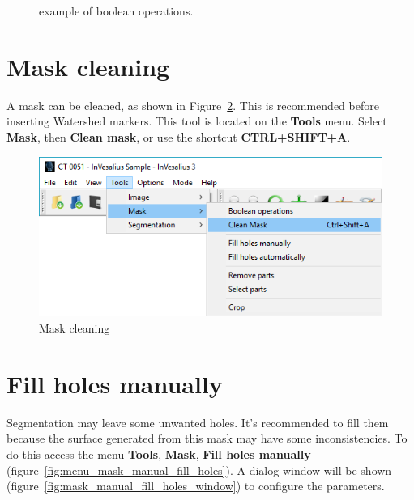 \begin{figure}[!htb]
  \hfill
  \caption{example of boolean operations.}
  \label{fig:op_boolana}
\end{figure}

\section{Mask cleaning}
\label{cap:limpeza_mascara}

A mask can be cleaned, as shown in Figure~\ref{fig:limpeza_mascara}. This is recommended before inserting Watershed markers. This tool is located on the \textbf{Tools} menu. Select \textbf{Mask}, then \textbf{Clean mask}, or use the shortcut \textbf{CTRL+SHIFT+A}.

\begin{figure}[!htb]
\centering
\includegraphics[scale=0.5]{../user_guide_figures/invesalius_screen/mask_clean_menu_en.png}
\caption{Mask cleaning}
\label{fig:limpeza_mascara}
\end{figure}

\section{Fill holes manually}

Segmentation may leave some unwanted holes. It's recommended to fill them because the surface generated from this mask may have some inconsistencies. To do this access the menu \textbf{Tools}, \textbf{Mask}, \textbf{Fill holes manually} (figure~\ref{fig:menu_mask_manual_fill_holes}). A dialog window will be shown (figure~\ref{fig:mask_manual_fill_holes_window}) to configure the parameters.

